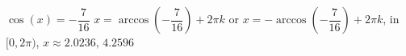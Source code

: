  {$\cos(x) = -\dfrac{7}{16}$}
{ $x =  \arccos\left(-\dfrac{7}{16}\right) + 2\pi k$ or $x = - \arccos\left(-\dfrac{7}{16}\right) + 2\pi k$, in  $[0, 2\pi)$, $x \approx 2.0236, \, 4.2596$}
